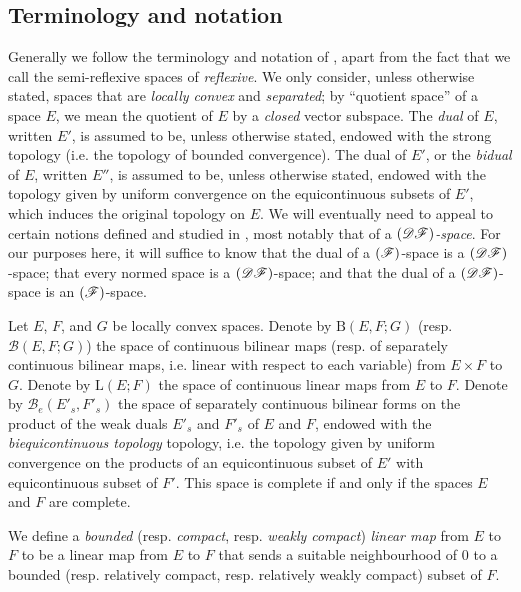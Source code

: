 \documentclass{article}
\theoremstyle{plain}
\newcommand{\BB}{\mathrm{B}}
\newcommand{\LL}{\mathrm{L}}
\newcommand{\sBB}{\mathscr{B}}
\newcommand{\DF}{\mbox{\normalfont($\mathscr{DF}$)}}
\newcommand{\FF}{\mbox{\normalfont($\mathscr{F}$)}}
\newcommand{\oldpage}[1]{\marginpar{\footnotesize$\Big\vert$ \textit{p.~#1}}}
\begin{document}
\subsection*{Terminology and notation}
%

Generally we follow the terminology and notation of \cite{3}, apart from the fact that we call the semi-reflexive spaces of \cite{3} \emph{reflexive}.
We only consider, unless otherwise stated, spaces that are \emph{locally convex} and \emph{separated};
by ``quotient space'' of a space $E$, we mean the quotient of $E$ by a \emph{closed} vector subspace.
The \emph{dual} of $E$, written $E'$, is assumed to be, unless otherwise stated, endowed with the strong topology (i.e. the topology
\oldpage{75}
of bounded convergence).
The dual of $E'$, or the \emph{bidual} of $E$, written $E''$, is assumed to be, unless otherwise stated, endowed with the topology given by uniform convergence on the equicontinuous subsets of $E'$, which induces the original topology on $E$.
We will eventually need to appeal to certain notions defined and studied in \cite{6}, most notably that of a \emph{$\DF$-space}.
For our purposes here, it will suffice to know that the dual of a $\FF$-space is a $\DF$-space; that every normed space is a $\DF$-space; and that the dual of a $\DF$-space is an $\FF$-space.

Let $E$, $F$, and $G$ be locally convex spaces.
Denote by $\BB(E,F;G)$ (resp. $\sBB(E,F;G)$) the space of continuous bilinear maps (resp. of separately continuous bilinear maps, i.e. linear with respect to each variable) from $E\times F$ to $G$.
Denote by $\LL(E;F)$ the space of continuous linear maps from $E$ to $F$.
Denote by $\sBB_e(E'_s,F'_s)$ the space of separately continuous bilinear forms on the product of the weak duals $E'_s$ and $F'_s$ of $E$ and $F$, endowed with the \emph{biequicontinuous topology} topology, i.e. the topology given by uniform convergence on the products of an equicontinuous subset of $E'$ with equicontinuous subset of $F'$.
This space is complete if and only if the spaces $E$ and $F$ are complete.

We define a \emph{bounded} (resp. \emph{compact}, resp. \emph{weakly compact}) \emph{linear map} from $E$ to $F$ to be a linear map from $E$ to $F$ that sends a suitable neighbourhood of $0$ to a bounded (resp. relatively compact, resp. relatively weakly compact) subset of $F$.
\end{document}
